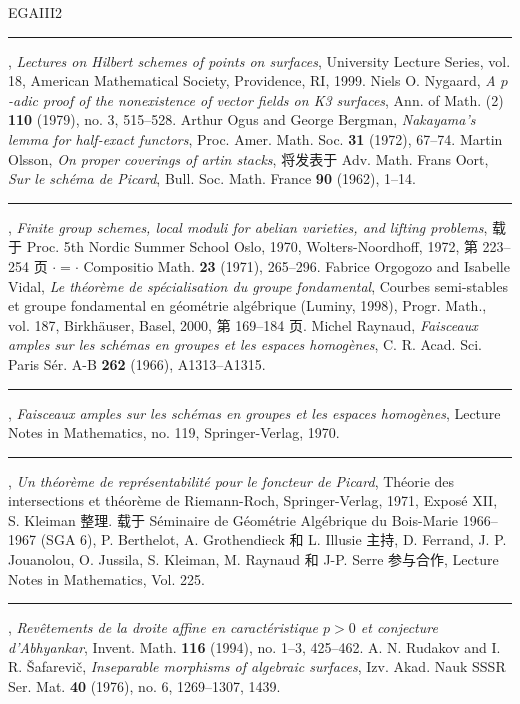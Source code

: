 \begin{thebibliography}{EGAIII2}
 \rule{2em}{.3pt}, \emph{Lectures on Hilbert schemes of points on surfaces}, University Lecture Series, vol. 18, American Mathematical Society, Providence, RI, 1999.
 Niels O. Nygaard, \emph{A $p$-adic proof of the nonexistence of vector fields on K3 surfaces}, Ann. of Math. (2) \textbf{110} (1979), no. 3, 515--528.
 Arthur Ogus and George Bergman, \emph{Nakayama's lemma for half-exact functors}, Proc. Amer. Math. Soc. \textbf{31} (1972), 67--74.
 Martin Olsson, \emph{On proper coverings of artin stacks}, 将发表于 Adv. Math.
 Frans Oort, \emph{Sur le schéma de Picard}, Bull. Soc. Math. France \textbf{90} (1962), 1--14.
 \rule{2em}{.3pt}, \emph{Finite group schemes, local moduli for abelian varieties, and lifting problems}, 载于 Proc. 5th Nordic Summer School Oslo, 1970, Wolters-Noordhoff, 1972, 第 223--254 页 $\cdot=\cdot$ Compositio Math. \textbf{23} (1971), 265--296.
 Fabrice Orgogozo and Isabelle Vidal, \emph{Le théorème de spécialisation du groupe fondamental}, Courbes semi-stables et groupe fondamental en géométrie algébrique (Luminy, 1998), Progr. Math., vol. 187, Birkhäuser, Basel, 2000, 第 169--184 页.
 Michel Raynaud, \emph{Faisceaux amples sur les schémas en groupes et les espaces homogènes}, C. R. Acad. Sci. Paris Sér. A-B \textbf{262} (1966), A1313--A1315.
 \rule{2em}{.3pt}, \emph{Faisceaux amples sur les schémas en groupes et les espaces homogènes}, Lecture Notes in Mathematics, no. 119, Springer-Verlag, 1970.
 \rule{2em}{.3pt}, \emph{Un théorème de représentabilité pour le foncteur de Picard}, Théorie des intersections et théorème de Riemann-Roch, Springer-Verlag, 1971, Exposé XII, S. Kleiman 整理. 载于 Séminaire de Géométrie Algébrique du Bois-Marie 1966--1967 (SGA 6), P. Berthelot, A. Grothendieck 和 L. Illusie 主持, D. Ferrand, J. P. Jouanolou, O. Jussila, S. Kleiman, M. Raynaud 和 J-P. Serre 参与合作, Lecture Notes in Mathematics, Vol. 225.
 \rule{2em}{.3pt}, \emph{Revêtements de la droite affine en caractéristique $p>0$ et conjecture d'Abhyankar}, Invent. Math. \textbf{116} (1994), no. 1--3, 425--462.
 A. N. Rudakov and I. R. Šafarevič, \emph{Inseparable morphisms of algebraic surfaces}, Izv. Akad. Nauk SSSR Ser. Mat. \textbf{40} (1976), no. 6, 1269--1307, 1439.

\end{thebibliography}
